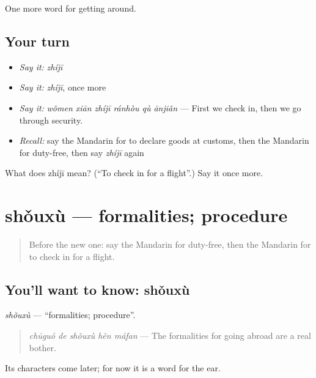 \begin{grammarlens}[title={What you've built}]
One more word for getting around.
\end{grammarlens}

\subsection*{Your turn}
\begin{itemize}
\raggedright
  \item \emph{Say it:} \emph{zhíjī}
  \item \emph{Say it:} \emph{zhíjī}, once more
  \item \emph{Say it:} \emph{wǒmen xiān zhíjī ránhòu qù ānjiǎn} — First we check in, then we go through security.
  \item \emph{Recall:} say the Mandarin for to declare goods at customs, then the Mandarin for duty-free, then say \emph{zhíjī} again
\end{itemize}

\begin{tcolorbox}[breakable,colback=teal!4,colframe=teal!35!black,title={Before you move on}]
What does zhíjī mean? (\textquotedblleft{}To check in for a flight\textquotedblright{}.) Say it once more.
\end{tcolorbox}
\section[shǒuxù]{shǒuxù — formalities; procedure}

\label{lesson:ZH-C418-shouxu}



\begin{quote}
Before the new one: say the Mandarin for duty-free, then the Mandarin for to check in for a flight.
\end{quote}

\subsection*{You'll want to know: shǒuxù}
\emph{shǒuxù} — \textquotedblleft{}formalities; procedure\textquotedblright{}.

\begin{quote}
\emph{chūguó de shǒuxù hěn máfan} — The formalities for going abroad are a real bother.
\end{quote}

Its characters come later; for now it is a word for the ear.

